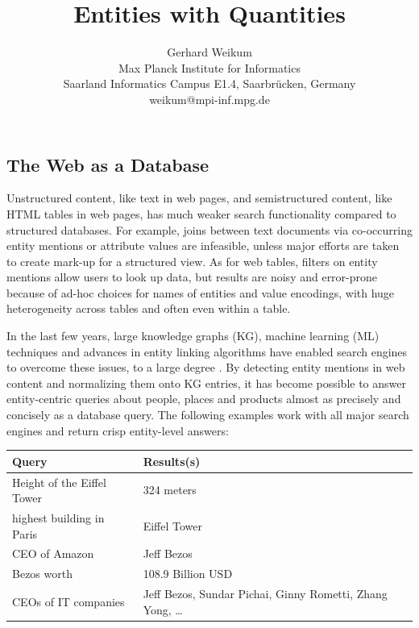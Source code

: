\documentclass[11pt]{article}
\begin{document}
\title{Entities with Quantities} %
\author{Gerhard Weikum\\Max Planck Institute for Informatics\\Saarland Informatics Campus E1.4, Saarbr\"ucken, Germany\\weikum@mpi-inf.mpg.de}



\subsection*{The Web as a Database }

Unstructured content, like text in web pages, and semistructured content, like HTML tables in web pages, has much weaker search functionality compared to structured databases. For example, joins between text documents via co-occurring entity mentions or attribute values are infeasible, unless major efforts are taken to create mark-up for a structured view. As for web tables, filters on entity mentions allow users to look up data, but results are noisy and 
error-prone because of ad-hoc choices for names of entities and value encodings, with huge heterogeneity across tables and often even within a table. 

In the last few years, large knowledge graphs (KG), 
machine learning (ML) techniques and advances in entity linking algorithms \cite{Mudgal:SIGMOD2018,Shen:TKDE2015}
have enabled search engines to overcome these issues, to a large degree \cite{Noy:CACM2019}.
By detecting entity mentions in web content and normalizing them onto KG entries, it has become possible to answer entity-centric queries about people, places and products almost as precisely and concisely as  a database query.
The following examples work with all major search engines and return
crisp entity-level answers:

\begin{center}
{\small
\begin{tabular}{|l|l|}\hline
Query & Results(s) \\ \hline
Height of the Eiffel Tower & 324 meters\\
highest building in Paris & Eiffel Tower\\
CEO of Amazon & Jeff Bezos\\
Bezos worth & 108.9 Billion USD\\
CEOs of IT companies &  Jeff Bezos, Sundar Pichai, Ginny Rometti, Zhang Yong, \dots\\ \hline
\end{tabular}
}
\end{center}
\end{document}
